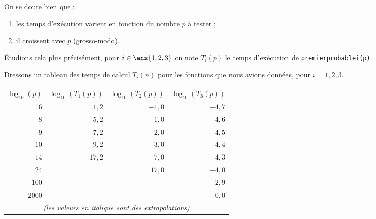 On se doute bien que :
\begin{enumerate}
\item les temps d'exécution varient en fonction du nombre $p$ à tester ;
\item il croissent avec $p$ (grosso-modo).
\end{enumerate}

\'Etudions cela plus précisément, pour $i \in \ens{1,2,3}$ on note $T_i(p)$ le temps d'exécution de \texttt{premierprobablei(p)}.



Dressons un tableau des temps de calcul $T_{i}(n)$ pour les fonctions
que nous avions données, pour $i=1, 2, 3$.

\begin{center}
\begin{tabular}{rrrr}
  $\log_{10}(p)$ & $\log_{10}(T_1(p))$& $\log_{10}(T_2(p))$ & $\log_{10}(T_3(p))$\\
$6$     & $1,2$         & $-1,0$        & $-4,7$\\
$8$     &$\mathit{5,2}$   & $1,0$         & $-4,6$\\
$9$     &$\mathit{7,2}$   & $\mathit{2,0}$  & $-4,5$\\
$10$    & $\mathit{9,2}$  & $\mathit{3,0}$  & $-4,4$\\
$14$    & $\mathit{17,2}$ & $\mathit{7,0}$  & $-4,3$\\
$24$    & %
                        & $\mathit{17,0}$ & $-4,0$\\
$100$ & & %
                        & $-2,9$\\
$2000$ & & & $0,0$\\
\multicolumn{4}{c}{\emph{(les valeurs en italique sont des extrapolations)}}\\
\end{tabular}
\end{center}

